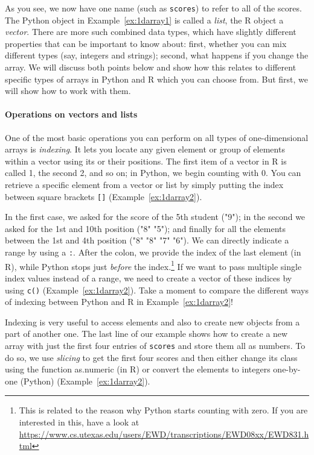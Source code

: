
As you see, we now have one name (such as \verb|scores|) to refer to all of the scores.
The Python object in Example~\ref{ex:1darray1} is called a \emph{list}, the R object a \emph{vector}.
There are more  such combined data types, which have slightly different
properties that can be important to know about: first, whether you can mix different
types (say, integers and strings); second, what happens if you change the array.
We will discuss both points below and show how this relates to different
specific types of arrays in Python and R which you can choose from. But first,
we will show how to work with them.


\paragraph{Operations on vectors and lists}
One of the most
basic operations you can perform on all types of one-dimensional arrays
is \emph{indexing}. It lets you locate any given
element or group of elements within a vector using its or their
positions. The first item of a vector in R is called 1, the second 2, and so on;
in Python, we begin counting with 0.  You can retrieve a specific element
from a vector or list by simply putting the index between square brackets \verb|[]| (Example~\ref{ex:1darray2}).


In the first case, we asked for the score of the 5th student ("9");
in the second we asked for the 1st and 10th position ("8" "5"); and
finally for all the elements between the 1st and 4th position ("8"
"8" "7" "6"). We can directly indicate a range
by using a \verb|:|. After the colon, we provide the index of
the last element (in R), while Python stops just \emph{before} the index.\footnote{This is related to the
reason why Python starts counting with zero. If you are interested
in this, have a look at \url{https://www.cs.utexas.edu/users/EWD/transcriptions/EWD08xx/EWD831.html}}
If we want to pass multiple single index values instead of a range,
we need to create a vector of these indices by using \verb|c()| (Example~\ref{ex:1darray2}).
Take a moment to compare the different ways of indexing between Python
and R in Example~\ref{ex:1darray2}!

Indexing is very useful to access elements and also to
create new objects from a part of another one. The last line of our
example shows how to create a new array with just the first four
entries of \verb|scores| and store them all as numbers. To do so, we
use \emph{slicing} to get the first four scores and then either change its class using the function
as.numeric (in R) or convert the elements to integers one-by-one (Python)  (Example~\ref{ex:1darray2}).


